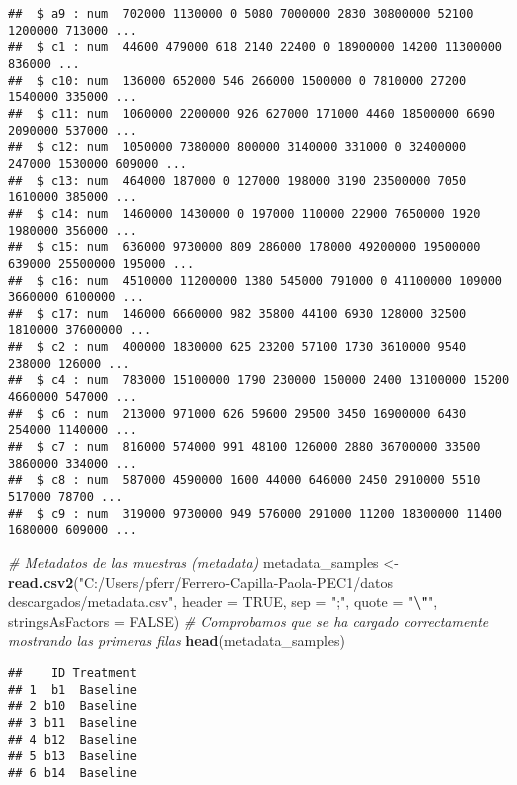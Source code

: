 \documentclass[
]{article}
\newenvironment{Shaded}{\begin{snugshade}}{\end{snugshade}}
\newcommand{\AttributeTok}[1]{\textcolor[rgb]{0.13,0.29,0.53}{#1}}
\newcommand{\CommentTok}[1]{\textcolor[rgb]{0.56,0.35,0.01}{\textit{#1}}}
\newcommand{\ConstantTok}[1]{\textcolor[rgb]{0.56,0.35,0.01}{#1}}
\newcommand{\FunctionTok}[1]{\textcolor[rgb]{0.13,0.29,0.53}{\textbf{#1}}}
\newcommand{\NormalTok}[1]{#1}
\newcommand{\OtherTok}[1]{\textcolor[rgb]{0.56,0.35,0.01}{#1}}
\newcommand{\SpecialCharTok}[1]{\textcolor[rgb]{0.81,0.36,0.00}{\textbf{#1}}}
\newcommand{\StringTok}[1]{\textcolor[rgb]{0.31,0.60,0.02}{#1}}
\begin{document}
\begin{verbatim}
##  $ a9 : num  702000 1130000 0 5080 7000000 2830 30800000 52100 1200000 713000 ...
##  $ c1 : num  44600 479000 618 2140 22400 0 18900000 14200 11300000 836000 ...
##  $ c10: num  136000 652000 546 266000 1500000 0 7810000 27200 1540000 335000 ...
##  $ c11: num  1060000 2200000 926 627000 171000 4460 18500000 6690 2090000 537000 ...
##  $ c12: num  1050000 7380000 800000 3140000 331000 0 32400000 247000 1530000 609000 ...
##  $ c13: num  464000 187000 0 127000 198000 3190 23500000 7050 1610000 385000 ...
##  $ c14: num  1460000 1430000 0 197000 110000 22900 7650000 1920 1980000 356000 ...
##  $ c15: num  636000 9730000 809 286000 178000 49200000 19500000 639000 25500000 195000 ...
##  $ c16: num  4510000 11200000 1380 545000 791000 0 41100000 109000 3660000 6100000 ...
##  $ c17: num  146000 6660000 982 35800 44100 6930 128000 32500 1810000 37600000 ...
##  $ c2 : num  400000 1830000 625 23200 57100 1730 3610000 9540 238000 126000 ...
##  $ c4 : num  783000 15100000 1790 230000 150000 2400 13100000 15200 4660000 547000 ...
##  $ c6 : num  213000 971000 626 59600 29500 3450 16900000 6430 254000 1140000 ...
##  $ c7 : num  816000 574000 991 48100 126000 2880 36700000 33500 3860000 334000 ...
##  $ c8 : num  587000 4590000 1600 44000 646000 2450 2910000 5510 517000 78700 ...
##  $ c9 : num  319000 9730000 949 576000 291000 11200 18300000 11400 1680000 609000 ...
\end{verbatim}

\begin{Shaded}
\begin{Highlighting}[]
\CommentTok{\# Metadatos de las muestras (metadata)}
\NormalTok{metadata\_samples }\OtherTok{\textless{}{-}} \FunctionTok{read.csv2}\NormalTok{(}\StringTok{"C:/Users/pferr/Ferrero{-}Capilla{-}Paola{-}PEC1/datos descargados/metadata.csv"}\NormalTok{, }\AttributeTok{header =} \ConstantTok{TRUE}\NormalTok{, }\AttributeTok{sep =} \StringTok{";"}\NormalTok{, }\AttributeTok{quote =} \StringTok{"}\SpecialCharTok{\textbackslash{}"}\StringTok{"}\NormalTok{, }\AttributeTok{stringsAsFactors =} \ConstantTok{FALSE}\NormalTok{)}
\CommentTok{\# Comprobamos que se ha cargado correctamente mostrando las primeras filas}
\FunctionTok{head}\NormalTok{(metadata\_samples)}
\end{Highlighting}
\end{Shaded}

\begin{verbatim}
##    ID Treatment
## 1  b1  Baseline
## 2 b10  Baseline
## 3 b11  Baseline
## 4 b12  Baseline
## 5 b13  Baseline
## 6 b14  Baseline
\end{verbatim}
\end{document}
